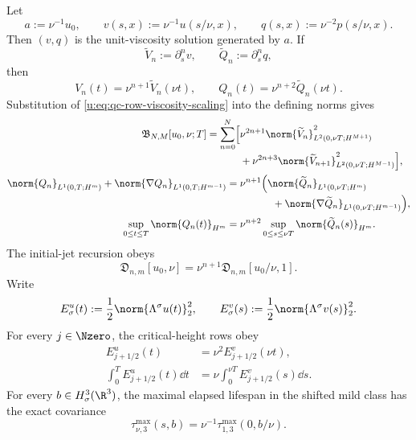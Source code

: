\begin{proposition}
\label{u:prop:qc-exact-viscosity-scaling}
Let
\[
 a:=\nu^{-1}u_0,
 \qquad
 v(s,x):=\nu^{-1}u(s/\nu,x),
 \qquad
 q(s,x):=\nu^{-2}p(s/\nu,x).
\]
Then \((v,q)\) is the unit-viscosity solution generated by \(a\).  If
\[
 \widetilde V_n:=\partial_s^nv,
 \qquad
 \widetilde Q_n:=\partial_s^nq,
\]
then
\begin{equation}
 V_n(t)=\nu^{n+1}\widetilde V_n(\nu t),
 \qquad
 Q_n(t)=\nu^{n+2}\widetilde Q_n(\nu t).
 \label{u:eq:qc-row-viscosity-scaling}
\end{equation}
Substitution of \eqref{u:eq:qc-row-viscosity-scaling} into the defining norms gives
\begin{align}
 \mathfrak B_{N,M}[u_0,\nu;T]
 =\sum_{n=0}^{N}\Bigl[{}
 &\nu^{2n+1}
 \norm{\widetilde V_n}_{L^2(0,\nu T;H^{M+1})}^2
 \notag\\[-2pt]
 &+\nu^{2n+3}
 \norm{\widetilde V_{n+1}}_{L^2(0,\nu T;H^{M-1})}^2
 \Bigr],
 \label{u:eq:qc-rectangle-viscosity-scaling}\\
 \norm{Q_n}_{L^1(0,T;H^m)}
 +\norm{\nabla Q_n}_{L^1(0,T;H^{m-1})}
 ={}&\nu^{n+1}\Bigl(
 \norm{\widetilde Q_n}_{L^1(0,\nu T;H^m)}
 \notag\\[-2pt]
 &\hspace{32pt}+
 \norm{\nabla\widetilde Q_n}_{L^1(0,\nu T;H^{m-1})}
 \Bigr),
 \label{u:eq:qc-pressure-viscosity-scaling}\\
 \sup_{0\le t\le T}\norm{Q_n(t)}_{H^m}
 ={}&\nu^{n+2}
 \sup_{0\le s\le\nu T}\norm{\widetilde Q_n(s)}_{H^m}.
 \label{u:eq:qc-pressure-sup-viscosity-scaling}
\end{align}
The initial-jet recursion obeys
\begin{equation}
 \mathfrak D_{n,m}[u_0,\nu]
 =\nu^{n+1}\mathfrak D_{n,m}[u_0/\nu,1].
 \label{u:eq:qc-initial-jet-viscosity-scaling}
\end{equation}
Write
\[
 E_\sigma^u(t):=\frac12\norm{\Lambda^\sigma u(t)}_2^2,
 \qquad
 E_\sigma^v(s):=\frac12\norm{\Lambda^\sigma v(s)}_2^2.
\]
For every \(j\in\Nzero\), the critical-height rows obey
\begin{align}
 E_{j+1/2}^u(t)
 &=\nu^2E_{j+1/2}^v(\nu t),
 \label{u:eq:qc-critical-height-viscosity-scaling}\\
 \int_0^T E_{j+1/2}^u(t)\dd t
 &=\nu\int_0^{\nu T}E_{j+1/2}^v(s)\dd s.
 \label{u:eq:qc-critical-height-mass-viscosity-scaling}
\end{align}
For every \(b\in H^3_\sigma(\R^3)\), the maximal elapsed lifespan in the
shifted mild class has the exact covariance
\begin{equation}
 \tau_{\nu,3}^{\max}(s,b)
 =\nu^{-1}\tau_{1,3}^{\max}(0,b/\nu).
 \label{u:eq:qc-maximal-lifespan-viscosity-scaling}
\end{equation}
\end{proposition}

